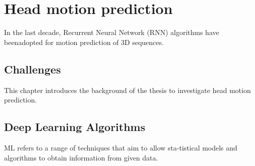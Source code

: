 \section{Head motion prediction}
\label{sec:theorie:head_pred}
In the last decade, Recurrent Neural Network (RNN) algorithms have beenadopted for motion prediction of 3D sequences.

\subsection{Challenges}
\label{sec:theorie:head_pred:challenges}
This chapter introduces the background of the thesis to investigate head motion prediction.


\subsection{Deep Learning Algorithms}
\label{sec:theorie:head_pred:deep}
ML refers to a range of techniques that aim to allow sta-tistical models and algorithms to obtain information from given data.